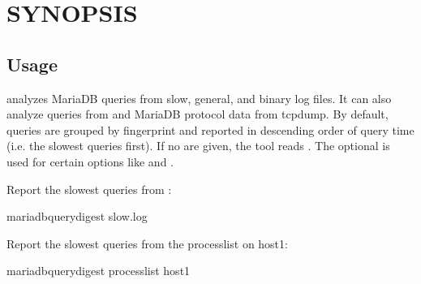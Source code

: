\documentclass[letterpaper,10pt,english]{sphinxmanual}
\begin{document}
\section{SYNOPSIS}
\label{\detokenize{mariadb-query-digest:synopsis}}

\subsection{Usage}
\label{\detokenize{mariadb-query-digest:usage}}
\begin{sphinxVerbatim}[commandchars=\\\{\}]
 \PYG{p}{[}\PYG{p}{]} \PYG{p}{[}\PYG{p}{]} \PYG{p}{[}\PYG{p}{]}
\end{sphinxVerbatim}

\sphinxAtStartPar
{} analyzes MariaDB queries from slow, general, and binary log
files.  It can also analyze queries from  and MariaDB
protocol data from tcpdump.  By default, queries are grouped by fingerprint
and reported in descending order of query time (i.e. the slowest queries
first).  If no  are given, the tool reads .  The optional
 is used for certain options like {\hyperref[\detokenize{mariadb-query-digest:cmdoption-mariadb-query-digest-since}]{}} and {\hyperref[\detokenize{mariadb-query-digest:cmdoption-mariadb-query-digest-until}]{}}.

\sphinxAtStartPar
Report the slowest queries from :

\begin{sphinxVerbatim}[commandchars=\\\{\}]
mariadb\PYGZhy{}query\PYGZhy{}digest slow.log
\end{sphinxVerbatim}

\sphinxAtStartPar
Report the slowest queries from the processlist on host1:

\begin{sphinxVerbatim}[commandchars=\\\{\}]
mariadb\PYGZhy{}query\PYGZhy{}digest \PYGZhy{}\PYGZhy{}processlist host1
\end{sphinxVerbatim}
\end{document}
